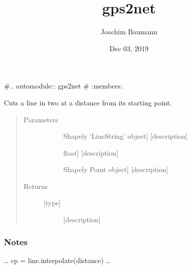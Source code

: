 \documentclass[letterpaper,10pt,english]{sphinxmanual}
\title{gps2net}
\date{Dec 03, 2019}
\author{Joachim Baumann}
\begin{document}
\pagestyle{empty}
\sphinxmaketitle
\pagestyle{plain}
\sphinxtableofcontents
\pagestyle{normal}
\label{\detokenize{index::doc}}


\#.. automodule:: gps2net
\#    :members:

\begin{fulllineitems}
\label{\detokenize{index:gps2net.cut}}
Cuts a line in two at a distance from its starting point.
\begin{quote}\begin{description}
\item[{Parameters}] \leavevmode\begin{description}
\item[{}] \leavevmode{[}Shapely ‘LineString’ object{]}
{[}description{]}

\item[{}] \leavevmode{[}float{]}
{[}description{]}

\item[{}] \leavevmode{[}Shapely Point object{]}
{[}description{]}

\end{description}

\item[{Returns}] \leavevmode\begin{description}
\item[{{[}type{]}}] \leavevmode
{[}description{]}

\end{description}

\end{description}\end{quote}
\subsubsection*{Notes}

…
cp = line.interpolate(distance)
…

\end{fulllineitems}


\begin{fulllineitems}
\label{\detokenize{index:gps2net.getShortestPathAStar}}~
\end{fulllineitems}
\end{document}
